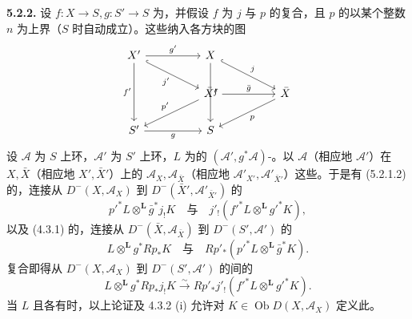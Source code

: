 \textbf{5.2.2.} 设 $f:X\to S,g:S'\to S$ 为，并假设 $f$ 为 $j$ 与 $p$ 的复合，且 $p$ 的以某个整数 $n$ 为上界（$S$ 时自动成立）。这些纳入各方块的图
\[\begin{tikzcd}X'\arrow[rr,"g'"]\arrow[drr,hook,"j'"']\arrow[dd,"f'"']&&X\arrow[drr,hook,"j"]\arrow[dd,"f"]&&\\&&\bar X'\arrow[rr,"\bar g"]\arrow[dll,"p'"']&&\bar X\arrow[dll,"p"]\\S'\arrow[rr,"g"']&&S&&\end{tikzcd}\]
设 $\mathscr A$ 为 $S$ 上环，$\mathscr A'$ 为 $S'$ 上环，$L$ 为的 $(\mathscr A',g^*\mathscr A)$-。以 $\mathscr A$（相应地 $\mathscr A'$）在 $X,\bar X$（相应地 $X',\bar X'$）上的 $\mathscr A_X,\mathscr A_{\bar X}$（相应地 $\mathscr A'_{X'},\mathscr A'_{\bar X'}$）这些。于是有 (5.2.1.2) 的，连接从 $D^-(X,\mathscr A_X)$ 到 $D^-(\bar X',\mathscr A'_{\bar X'})$ 的
\[p'^*L\otimes^{\mathbf L}\bar g^*j_!K\quad\text{与}\quad j'_!(f'^*L\otimes^{\mathbf L}g'^*K),\]
以及 (4.3.1) 的，连接从 $D^-(\bar X,\mathscr A_{\bar X})$ 到 $D^-(S',\mathscr A')$ 的
\[L\otimes^{\mathbf L}g^*Rp_*K\quad\text{与}\quad Rp'_*(p'^*L\otimes^{\mathbf L}\bar g^*K).\]
复合即得从 $D^-(X,\mathscr A_X)$ 到 $D^-(S',\mathscr A')$ 的间的
\[L\otimes^{\mathbf L}g^*Rp_*j_!K\xrightarrow{\sim}Rp'_*j'_!(f'^*L\otimes^{\mathbf L}g'^*K).\tag{5.2.2.1}\]
当 $L$ 且各有时，以上论证及 4.3.2 (i) 允许对 $K\in\operatorname{Ob}D(X,\mathscr A_X)$ 定义此。

